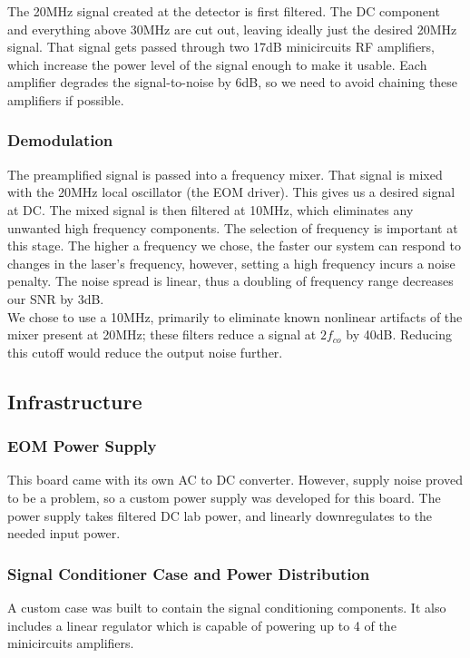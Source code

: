 The 20MHz signal created at the detector is first filtered.  The DC component and everything above 30MHz are cut out, leaving ideally just the desired 20MHz signal.  That signal gets passed through two 17dB minicircuits RF amplifiers, which increase the power level of the signal enough to make it usable.  Each amplifier degrades the signal-to-noise by 6dB, so we need to avoid chaining these amplifiers if possible. \\

    \subsubsection{Demodulation}

The preamplified signal is passed into a frequency mixer.  That signal is mixed with the 20MHz local oscillator (the EOM driver).  This gives us a desired signal at DC.  The mixed signal is then filtered at 10MHz, which eliminates any unwanted high frequency components.  The selection of frequency is important at this stage.  The higher a frequency we chose, the faster our system can respond to changes in the laser's frequency, however, setting a high frequency incurs a noise penalty.  The noise spread is linear, thus a doubling of frequency range decreases our SNR by 3dB. \\

We chose to use a 10MHz, primarily to eliminate known nonlinear artifacts of the mixer present at 20MHz; these filters reduce a signal at $2f_{co}$ by 40dB\cite{zfl_1000}.  Reducing this cutoff would reduce the output noise further. \\
    
\subsection{Infrastructure}
    \subsubsection{EOM Power Supply}

This board came with its own AC to DC converter.  However, supply noise proved to be a problem, so a custom power supply was developed for this board.  The power supply takes filtered DC lab power, and linearly downregulates to the needed input power. \\

    \subsubsection{Signal Conditioner Case and Power Distribution}

A custom case was built to contain the signal conditioning components.  It also includes a linear regulator which is capable of powering up to 4 of the minicircuits amplifiers.

